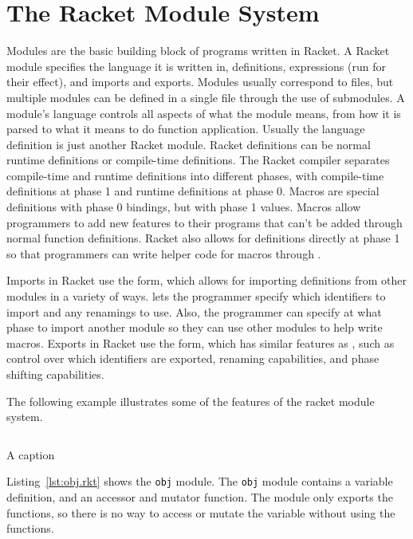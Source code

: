 \chapter{The Racket Module System}
Modules are the basic building block of programs written in Racket.
A Racket module specifies the language it is written in, definitions, expressions (run for their effect), and imports and exports. 
Modules usually correspond to files, but multiple modules can be defined in a single file through the use of submodules.
A module's language controls all aspects of what the module means, from how it is parsed to what it means to do function application. 
Usually the language definition is just another Racket module. 
Racket definitions can be normal runtime definitions or compile-time definitions.
The Racket compiler separates compile-time and runtime definitions into different phases, with compile-time definitions at phase 1 and runtime definitions at phase 0.
Macros are special definitions with phase 0 bindings, but with phase 1 values. 
Macros allow programmers to add new features to their programs that can't be added through normal function definitions. 
Racket also allows for definitions directly at phase 1 so that programmers can write helper code for macros through .

Imports in Racket use the  form, which allows for importing definitions from other modules in a variety of ways. 
 lets the programmer specify which identifiers to import and any renamings to use.
Also, the programmer can specify at what phase to import another module so they can use other modules to help write macros.
Exports in Racket use the  form, which has similar features as , such as control over which identifiers are exported, renaming capabilities, and phase shifting capabilities.

The following example illustrates some of the features of the racket module system. 

\begin{listing}
  \inputminted{racket}{listings/obj.rkt}
  \caption{A caption}
  \label{lst:obj.rkt}
\end{listing}

Listing~\ref{lst:obj.rkt} shows the \texttt{obj} module.
The \texttt{obj} module contains a variable definition, and an accessor and mutator function.
The module only exports the functions, so there is no way to access or mutate the variable without using the functions.


